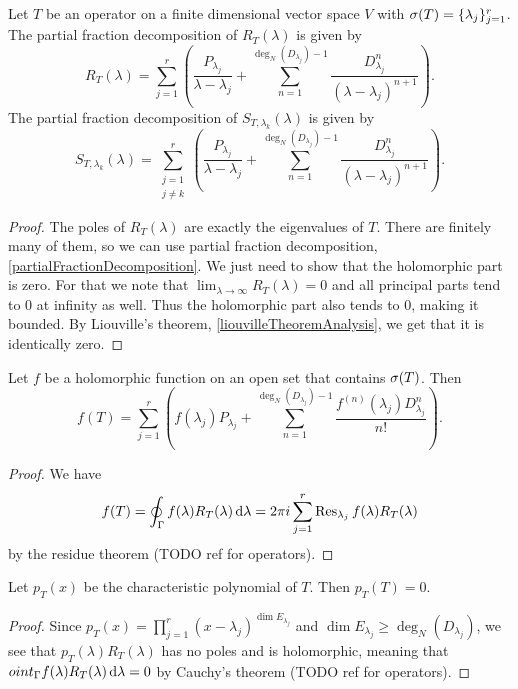 \begin{proposition}
Let $T$ be an operator on a finite dimensional vector space $V$ with $\sigma(T) = \{\lambda_j\}_{j=1}^r$. The partial fraction decomposition of $R_T(\lambda)$ is given by
\[ R_T(\lambda) = \sum_{j=1}^r\left(\frac{P_{\lambda_j}}{\lambda - \lambda_j} +\sum_{n=1}^{\deg_N(D_{\lambda_j})-1}\frac{D_{\lambda_j}^n}{(\lambda - \lambda_j)^{n+1}}\right). \]
The partial fraction decomposition of $S_{T,\lambda_k}(\lambda)$ is given by
\[ S_{T,\lambda_k}(\lambda) = \sum_{\substack{j=1 \\ j\neq k}}^r\left(\frac{P_{\lambda_j}}{\lambda - \lambda_j} +\sum_{n=1}^{\deg_N(D_{\lambda_j})-1}\frac{D_{\lambda_j}^n}{(\lambda - \lambda_j)^{n+1}}\right). \]
\end{proposition}
\begin{proof}
The poles of $R_T(\lambda)$ are exactly the eigenvalues of $T$. There are finitely many of them, so we can use partial fraction decomposition, \ref{partialFractionDecomposition}. We just need to show that the holomorphic part is zero. For that we note that $\lim_{\lambda \to \infty} R_T(\lambda) = 0$ and all principal parts tend to $0$ at infinity as well. Thus the holomorphic part also tends to $0$, making it bounded. By Liouville's theorem, \ref{liouvilleTheoremAnalysis}, we get that it is identically zero.
\end{proof}
\begin{corollary}
Let $f$ be a holomorphic function on an open set that contains $\sigma(T)$. Then
\[ f(T) = \sum_{j=1}^r\left(f(\lambda_j)P_{\lambda_j} +\sum_{n=1}^{\deg_N(D_{\lambda_j})-1}\frac{f^{(n)}(\lambda_j)D_{\lambda_j}^n}{n!}\right). \] 
\end{corollary}
\begin{proof}
We have
\[ f(T) = \oint_\Gamma f(\lambda)R_T(\lambda)\operatorname{d \!}{\lambda} = 2\pi i\sum_{j=1}^r \operatorname{Res}_{\lambda_j}f(\lambda)R_T(\lambda) \]
by the residue theorem (TODO ref for operators).
\end{proof}
\begin{corollary}
Let $p_T(x)$ be the characteristic polynomial of $T$. Then $p_T(T) = 0$.
\end{corollary}
\begin{proof}
Since $p_T(x) = \prod_{j=1}^r(x - \lambda_j)^{\dim E_{\lambda_j}}$ and $\dim E_{\lambda_j} \geq \deg_N(D_{\lambda_j})$, we see that $p_T(\lambda)R_T(\lambda)$ has no poles and is holomorphic, meaning that $oint_\Gamma f(\lambda)R_T(\lambda)\operatorname{d \!}{\lambda} = 0$ by Cauchy's theorem (TODO ref for operators).
\end{proof}

